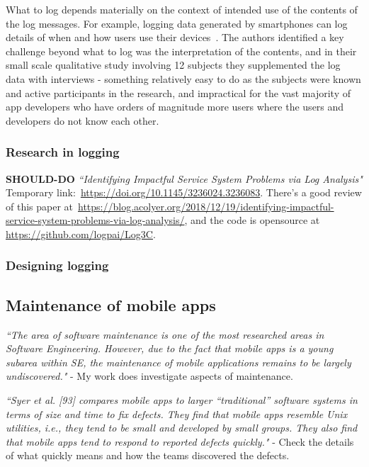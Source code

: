 What to log depends materially on the context of intended use of the contents of the log messages. For example, logging data generated by smartphones can log details of when and how users use their devices~\citep{ormen2015_smartphone_log_data_qualitative_perspective}. The authors identified a key challenge beyond what to log was the interpretation of the contents, and in their small scale qualitative study involving 12 subjects they supplemented the log data with interviews - something relatively easy to do as the subjects were known and active participants in the research, and impractical for the vast majority of app developers who have orders of magnitude more users where the users and developers do not know each other.




\subsubsection{Research in logging}
\textbf{SHOULD-DO} \emph{``Identifying Impactful Service System Problems via Log Analysis"} Temporary link:~\url{https://doi.org/10.1145/3236024.3236083}. There's a good review of this paper at~\url{https://blog.acolyer.org/2018/12/19/identifying-impactful-service-system-problems-via-log-analysis/}, and the code is opensource at \url{https://github.com/logpai/Log3C}.


\subsubsection{Designing logging}

\subsection{Maintenance of mobile apps}
\emph{``The area of software maintenance is one of the most researched areas in Software Engineering. However, due to the fact that mobile apps is a young subarea within SE, the maintenance of mobile applications remains to be largely undiscovered."} - My work does investigate aspects of maintenance. 

\emph{``Syer et al. [93] compares mobile apps to larger “traditional” software systems in terms of size and time to fix defects. They find that mobile apps resemble Unix utilities, i.e., they tend to be small and developed by small groups. They also find that mobile apps tend to respond to reported defects quickly."} - Check the details of what quickly means and how the teams discovered the defects.

